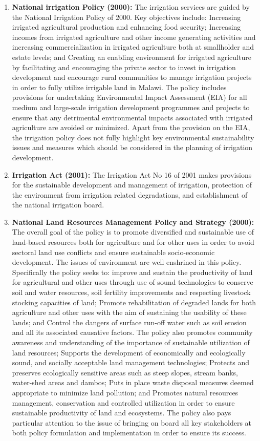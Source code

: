 \documentclass[
]{book}
\begin{document}
\begin{enumerate}
\item
  \textbf{National irrigation Policy (2000):} The irrigation services are guided by the National Irrigation Policy of 2000. Key objectives include: Increasing irrigated agricultural production and enhancing food security; Increasing incomes from irrigated agriculture and other income generating activities and increasing commercialization in irrigated agriculture both at smallholder and estate levels; and Creating an enabling environment for irrigated agriculture by facilitating and encouraging the private sector to invest in irrigation development and encourage rural communities to manage irrigation projects in order to fully utilize irrigable land in Malawi. The policy includes provisions for undertaking Environmental Impact Assessment (EIA) for all medium and large-scale irrigation development programmes and projects to ensure that any detrimental environmental impacts associated with irrigated agriculture are avoided or minimized. Apart from the provision on the EIA, the irrigation policy does not fully highlight key environmental sustainability issues and measures which should be considered in the planning of irrigation development.
\item
  \textbf{Irrigation Act (2001):} The Irrigation Act No 16 of 2001 makes provisions for the sustainable development and management of irrigation, protection of the environment from irrigation related degradations, and establishment of the national irrigation board.
\item
  \textbf{National Land Resources Management Policy and Strategy (2000):} The overall goal of the policy is to promote diversified and sustainable use of land-based resources both for agriculture and for other uses in order to avoid sectoral land use conflicts and ensure sustainable socio-economic development. The issues of environment are well enshrined in this policy. Specifically the policy seeks to: improve and sustain the productivity of land for agricultural and other uses through use of sound technologies to conserve soil and water resources, soil fertility improvements and respecting livestock stocking capacities of land; Promote rehabilitation of degraded lands for both agriculture and other uses with the aim of sustaining the usability of these lands; and Control the dangers of surface run-off water such as soil erosion and all its associated causative factors. The policy also promotes community awareness and understanding of the importance of sustainable utilization of land resources; Supports the development of economically and ecologically sound, and socially acceptable land management technologies; Protects and preserves ecologically sensitive areas such as steep slopes, stream banks, water-shed areas and dambos; Puts in place waste disposal measures deemed appropriate to minimize land pollution; and Promotes natural resources management, conservation and controlled utilization in order to ensure sustainable productivity of land and ecosystems. The policy also pays particular attention to the issue of bringing on board all key stakeholders at both policy formulation and implementation in order to ensure its success.

\end{enumerate}
\end{document}
